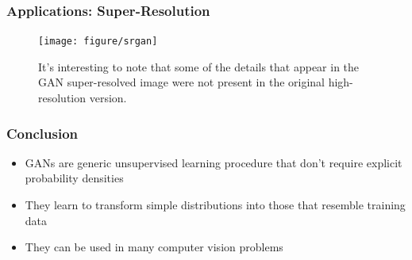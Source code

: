 \documentclass[10pt,mathserif]{beamer}
\begin{document}
\begin{frame}
  \frametitle{Applications: Super-Resolution}
  \begin{figure}[ht]
  \centering
  \texttt{[image: figure/srgan]}
  \caption{It's interesting to note that some of the details that appear in the
    GAN super-resolved image were not present in the original high-resolution
    version.}
  \end{figure}
\end{frame}

\begin{frame}
  \frametitle{Conclusion}
  \begin{itemize}
    \item GANs are generic unsupervised learning procedure that don't require
      explicit probability densities
    \item They learn to transform simple distributions into those that resemble training data
    \item They can be used in many computer vision problems
  \end{itemize}
\end{frame}


\end{document}

